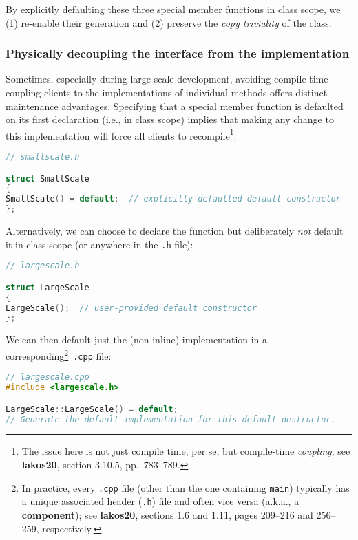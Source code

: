 \noindent By explicitly defaulting these three special member functions {in class
scope}, we (1) re-enable their generation and (2) preserve the
\emph{copy triviality} of the class.

\subsubsection[Physically decoupling the interface from the implementation]{Physically decoupling the interface from the implementation}\label{physically-decoupling-the-interface-from-the-implementation}

Sometimes, especially during large-scale development, avoiding compile-time coupling clients to the
implementations of individual methods offers distinct maintenance advantages. Specifying that a special member
function is defaulted on its first declaration (i.e., in class scope)
implies that making any change to this implementation will force all
clients to recompile{\cprotect\footnote{The issue here is not just
compile time, per se, but compile-time \emph{coupling}; see
\textbf{{lakos20}}, section 3.10.5, pp.~783--789.}}:

\begin{lstlisting}[language=C++]
// smallscale.h

struct SmallScale
{
SmallScale() = default;  // explicitly defaulted default constructor
};
\end{lstlisting}

\noindent Alternatively, we can choose to declare the function but deliberately
\emph{not} default it in class scope (or anywhere in the \texttt{.h}
file):

\begin{lstlisting}[language=C++]
// largescale.h

struct LargeScale
{
LargeScale();  // user-provided default constructor
};
\end{lstlisting}

\noindent We can then default just the (non-inline) implementation in a
corresponding{\cprotect\footnote{In practice, every \texttt{.cpp} file
(other than the one containing \texttt{main}) typically has a unique
associated header (\texttt{.h}) file and often vice versa (a.k.a., a
\textbf{component}); see \textbf{{lakos20}}, sections 1.6 and 1.11,
pages 209--216 and 256--259, respectively.}}~\texttt{.cpp} file:

\begin{lstlisting}[language=C++]
// largescale.cpp
#include <largescale.h>

LargeScale::LargeScale() = default;
// Generate the default implementation for this default destructor.
\end{lstlisting}

